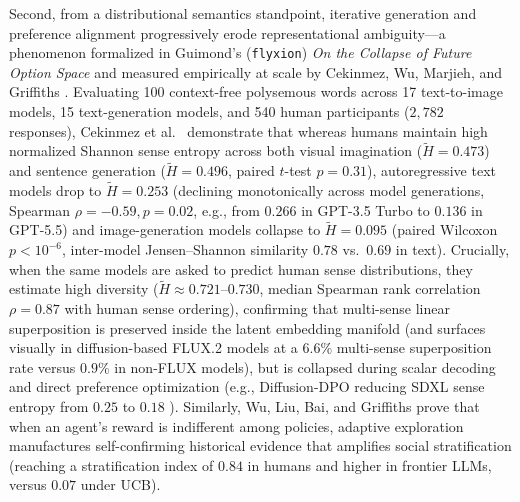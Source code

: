 \documentclass[10pt, twocolumn, a4paper]{article}
\begin{document}
Second, from a distributional semantics standpoint, iterative generation and preference alignment progressively erode representational ambiguity---a phenomenon formalized in Guimond's (\texttt{flyxion}) \textit{On the Collapse of Future Option Space} \cite{guimond2026collapse} and measured empirically at scale by Cekinmez, Wu, Marjieh, and Griffiths \cite{cekinmez2026ambiguity}. Evaluating 100 context-free polysemous words across 17 text-to-image models, 15 text-generation models, and 540 human participants ($2,782$ responses), Cekinmez et al.\ \cite{cekinmez2026ambiguity} demonstrate that whereas humans maintain high normalized Shannon sense entropy across both visual imagination ($\tilde{H} = 0.473$) and sentence generation ($\tilde{H} = 0.496$, paired $t$-test $p = 0.31$), autoregressive text models drop to $\tilde{H} = 0.253$ (declining monotonically across model generations, Spearman $\rho = -0.59, p = 0.02$, e.g., from $0.266$ in GPT-3.5 Turbo to $0.136$ in GPT-5.5) and image-generation models collapse to $\tilde{H} = 0.095$ (paired Wilcoxon $p < 10^{-6}$, inter-model Jensen--Shannon similarity $0.78$ vs.\ $0.69$ in text). Crucially, when the same models are asked to predict human sense distributions, they estimate high diversity ($\tilde{H} \approx 0.721\text{--}0.730$, median Spearman rank correlation $\rho = 0.87$ with human sense ordering), confirming that multi-sense linear superposition \cite{arora2018linear, white2022schrodinger, elhage2022superposition} is preserved inside the latent embedding manifold (and surfaces visually in diffusion-based FLUX.2 models at a $6.6\%$ multi-sense superposition rate versus $0.9\%$ in non-FLUX models), but is collapsed during scalar decoding and direct preference optimization (e.g., Diffusion-DPO reducing SDXL sense entropy from $0.25$ to $0.18$ \cite{cekinmez2026ambiguity}). Similarly, Wu, Liu, Bai, and Griffiths \cite{wu2026biases} prove that when an agent's reward is indifferent among policies, adaptive exploration manufactures self-confirming historical evidence that amplifies social stratification (reaching a stratification index of $0.84$ in humans and higher in frontier LLMs, versus $0.07$ under UCB).
\end{document}
